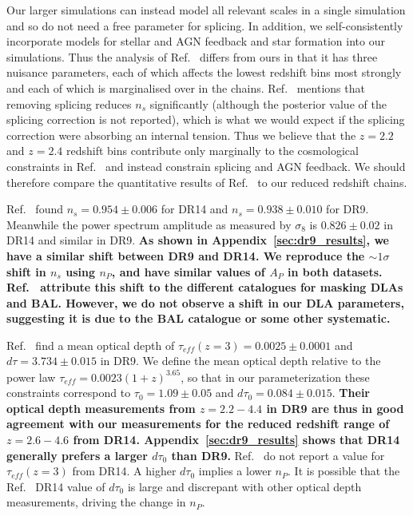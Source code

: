 Our larger simulations can instead model all relevant scales in a single simulation and so do not need a free parameter for splicing.
In addition, we self-consistently incorporate models for stellar and AGN feedback and star formation into our simulations.
Thus the analysis of Ref.~\cite{2020JCAP...04..038P} differs from ours in that it has three nuisance parameters, each of which affects the lowest redshift bins most strongly and each of which is marginalised over in the chains.
Ref.~\cite{2015JCAP...02..045P} mentions that removing splicing reduces $n_s$ significantly (although the posterior value of the splicing correction is not reported), which is what we would expect if the splicing correction were absorbing an internal tension. 
Thus we believe that the $z=2.2$ and $z=2.4$ redshift bins contribute only marginally to the cosmological constraints in Ref.~\cite{2020JCAP...04..038P} and instead constrain splicing and AGN feedback. 
We should therefore compare the quantitative results of Ref.~\cite{2020JCAP...04..038P} to our reduced redshift chains. 

Ref.~\cite{2020JCAP...04..038P} found $n_s = 0.954 \pm 0.006$ for DR14 and $n_s = 0.938 \pm 0.010$ for DR9.
Meanwhile the power spectrum amplitude as measured by $\sigma_8$ is $0.826 \pm 0.02$ in DR14 and similar in DR9.
\textbf{As shown in Appendix~\ref{sec:dr9_results}, we have a similar shift between DR9 and DR14. We reproduce the $\sim 1\sigma$ shift in $n_s$ using $n_P$, and have similar values of $A_P$ in both datasets. Ref.~\cite{2020JCAP...04..038P} attribute this shift to the different catalogues for masking DLAs and BAL. However, we do not observe a shift in our DLA parameters, suggesting it is due to the BAL catalogue or some other systematic.}

Ref.~\cite{2015JCAP...11..011P} find a mean optical depth of $\tau_{eff} (z=3) = 0.0025 \pm 0.0001$ and $d\tau = 3.734 \pm 0.015$ in DR9.
We define the mean optical depth relative to the power law $\tau_{eff} = 0.0023 (1+z)^{3.65}$, so that in our parameterization these constraints correspond to $\tau_0 = 1.09 \pm 0.05$ and $d\tau_0 = 0.084\pm 0.015$.
\textbf{Their optical depth measurements from $z=2.2 - 4.4$ in DR9 are thus in good agreement with our measurements for the reduced redshift range of $z=2.6 - 4.6$ from DR14. Appendix~\ref{sec:dr9_results} shows that DR14 generally prefers a larger $d\tau_0$ than DR9.}
Ref.~\cite{2020JCAP...04..038P} do not report a value for $\tau_{eff}(z=3)$ from DR14. A higher $d\tau_0$ implies a lower $n_P$. It is possible that the Ref.~\cite{2020JCAP...04..038P} DR14 value of $d\tau_0$ is large and discrepant with other optical depth measurements, driving the change in $n_P$.

